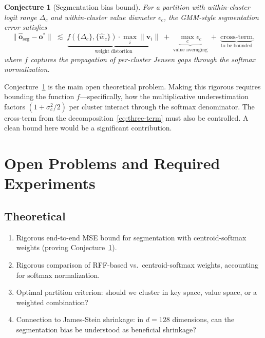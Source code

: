 \documentclass[11pt,a4paper]{article}
\newtheorem{conjecture}[theorem]{Conjecture}
\theoremstyle{definition}
\newcommand{\vv}{\mathbf{v}}
\newcommand{\oo}{\mathbf{o}}
\begin{document}
\begin{conjecture}[Segmentation bias bound]\label{conj:bias}
For a partition with within-cluster logit range $\Delta_c$ and within-cluster
value diameter $\epsilon_c$, the GMM-style segmentation error satisfies
\[
  \|\hat{\oo}_{\mathrm{seg}} - \oo^{*}\|
  \;\lesssim\;
  \underbrace{f(\{\Delta_c\},\{\hat{w}_c\})\cdot\max_i\|\vv_i\|}
    _{\text{weight distortion}}
  \;+\; \underbrace{\max_c\epsilon_c}_{\text{value averaging}}
  \;+\; \underbrace{\text{cross-term}}_{\text{to be bounded}},
\]
where $f$ captures the propagation of per-cluster Jensen gaps through the
softmax normalization.
\end{conjecture}

\begin{researchnote}
Conjecture~\ref{conj:bias} is the main open theoretical problem.  Making this
rigorous requires bounding the function $f$---specifically, how the
multiplicative underestimation factors $(1+\sigma_c^2/2)$ per cluster
interact through the softmax denominator.  The cross-term from the
decomposition~\eqref{eq:three-term} must also be controlled.  A clean bound
here would be a significant contribution.
\end{researchnote}


\section{Open Problems and Required Experiments}\label{sec:open}

\subsection{Theoretical}
\begin{enumerate}[nosep]
  \item Rigorous end-to-end MSE bound for segmentation with centroid-softmax
    weights (proving Conjecture~\ref{conj:bias}).
  \item Rigorous comparison of RFF-based vs.\ centroid-softmax weights,
    accounting for softmax normalization.
  \item Optimal partition criterion: should we cluster in key space, value
    space, or a weighted combination?
  \item Connection to James-Stein shrinkage: in $d=128$ dimensions, can the
    segmentation bias be understood as beneficial shrinkage?
\end{enumerate}
\end{document}
